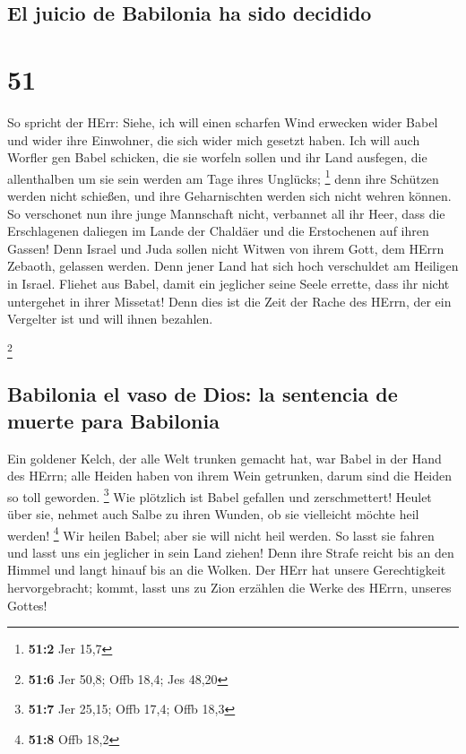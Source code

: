 \hypertarget{el-juicio-de-babilonia-ha-sido-decidido}{%
\subsection{El juicio de Babilonia ha sido
decidido}\label{el-juicio-de-babilonia-ha-sido-decidido}}

\hypertarget{section-50}{%
\section{51}\label{section-50}}

 So spricht der HErr: Siehe, ich will einen scharfen Wind
erwecken wider Babel und wider ihre Einwohner, die sich wider mich
gesetzt haben.  Ich will auch Worfler gen Babel schicken,
die sie worfeln sollen und ihr Land ausfegen, die allenthalben um sie
sein werden am Tage ihres Unglücks; \footnote{\textbf{51:2} Jer 15,7}
 denn ihre Schützen werden nicht schießen, und ihre
Geharnischten werden sich nicht wehren können. So verschonet nun ihre
junge Mannschaft nicht, verbannet all ihr Heer,  dass die
Erschlagenen daliegen im Lande der Chaldäer und die Erstochenen auf
ihren Gassen!  Denn Israel und Juda sollen nicht Witwen
von ihrem Gott, dem HErrn Zebaoth, gelassen werden. Denn jener Land hat
sich hoch verschuldet am Heiligen in Israel.  Fliehet aus
Babel, damit ein jeglicher seine Seele errette, dass ihr nicht
untergehet in ihrer Missetat! Denn dies ist die Zeit der Rache des
HErrn, der ein Vergelter ist und will ihnen bezahlen.

\footnote{\textbf{51:6} Jer 50,8; Offb 18,4; Jes 48,20}

\hypertarget{babilonia-el-vaso-de-dios-la-sentencia-de-muerte-para-babilonia}{%
\subsection{Babilonia el vaso de Dios: la sentencia de muerte para
Babilonia}\label{babilonia-el-vaso-de-dios-la-sentencia-de-muerte-para-babilonia}}

 Ein goldener Kelch, der alle Welt trunken gemacht hat,
war Babel in der Hand des HErrn; alle Heiden haben von ihrem Wein
getrunken, darum sind die Heiden so toll geworden. \footnote{\textbf{51:7}
  Jer 25,15; Offb 17,4; Offb 18,3}  Wie plötzlich ist
Babel gefallen und zerschmettert! Heulet über sie, nehmet auch Salbe zu
ihren Wunden, ob sie vielleicht möchte heil werden! \footnote{\textbf{51:8}
  Offb 18,2}  Wir heilen Babel; aber sie will nicht heil
werden. So lasst sie fahren und lasst uns ein jeglicher in sein Land
ziehen! Denn ihre Strafe reicht bis an den Himmel und langt hinauf bis
an die Wolken.  Der HErr hat unsere Gerechtigkeit
hervorgebracht; kommt, lasst uns zu Zion erzählen die Werke des HErrn,
unseres Gottes!

